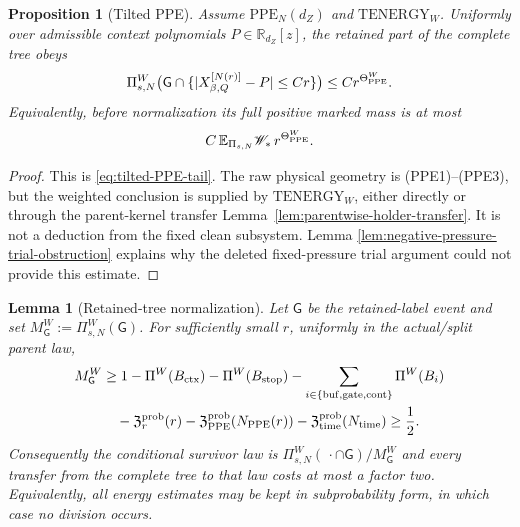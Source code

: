 \documentclass[11pt]{article}
\newtheorem{proposition}[theorem]{Proposition}
\newtheorem{lemma}[theorem]{Lemma}
\begin{document}
\begin{proposition}[Tilted PPE]
\label{prop:physical-legal-child}
Assume $\mathrm{PPE}_{N}(d_Z)$ and $\mathrm{TENERGY}_{W}$.  Uniformly over
admissible context polynomials $P\in\mathbb R_{d_Z}[z]$, the retained part of
the complete tree obeys
\begin{equation}
\label{eq:local-clean-sublevel}
 \Pi_{s,N}^{W}
 \bigl(\mathsf G\cap\{|X^{[N(r)]}_{\beta,Q}-P|\le Cr\}\bigr)
 \le Cr^{\Theta_{\rm PPE}^{W}}.
\end{equation}
Equivalently, before normalization its full positive marked mass is at most
\[
 C\,\mathbb E_{\Pi_{s,N}}\mathscr W_*\,r^{\Theta_{\rm PPE}^{W}}.
\]
\end{proposition}

\begin{proof}
This is \eqref{eq:tilted-PPE-tail}.  The raw physical geometry is
\textup{(PPE1)--(PPE3)}, but the weighted conclusion is supplied by
$\mathrm{TENERGY}_{W}$, either directly or through the parent-kernel
transfer Lemma~\ref{lem:parentwise-holder-transfer}.  It is not a deduction from the
fixed clean subsystem.  Lemma
\ref{lem:negative-pressure-trial-obstruction} explains why the deleted
fixed-pressure trial argument could not provide this estimate.
\end{proof}

\begin{lemma}[Retained-tree normalization]
\label{lem:retained-tree-normalization}
Let $\mathsf G$ be the retained-label event and set
$M_{\mathsf G}^{W}:=\Pi_{s,N}^{W}(\mathsf G)$.  For sufficiently small $r$,
uniformly in the actual/split parent law,
\begin{equation}
\label{eq:survivor-mass-lower-bound}
\begin{aligned}
 M_{\mathsf G}^{W}&\ge
  1-\Pi^W(B_{\rm ctx})-\Pi^W(B_{\rm stop})
   -\sum_{i\in\{\rm buf,gate,cont\}}\Pi^W(B_i)\\
 &\quad-\mathfrak Z_r^{\rm prob}(r)
   -\mathfrak Z_{\rm PPE}^{\rm prob}(N_{\rm PPE}(r))
   -\mathfrak Z_{\rm time}^{\rm prob}(N_{\rm time})
 \ge\frac12.
\end{aligned}
\end{equation}
Consequently the conditional survivor law is
$\Pi_{s,N}^{W}(\,\cdot\cap\mathsf G)/M_{\mathsf G}^{W}$ and every transfer
from the complete tree to that law costs at most a factor two.  Equivalently,
all energy estimates may be kept in subprobability form, in which case no
division occurs.
\end{lemma}
\end{document}
